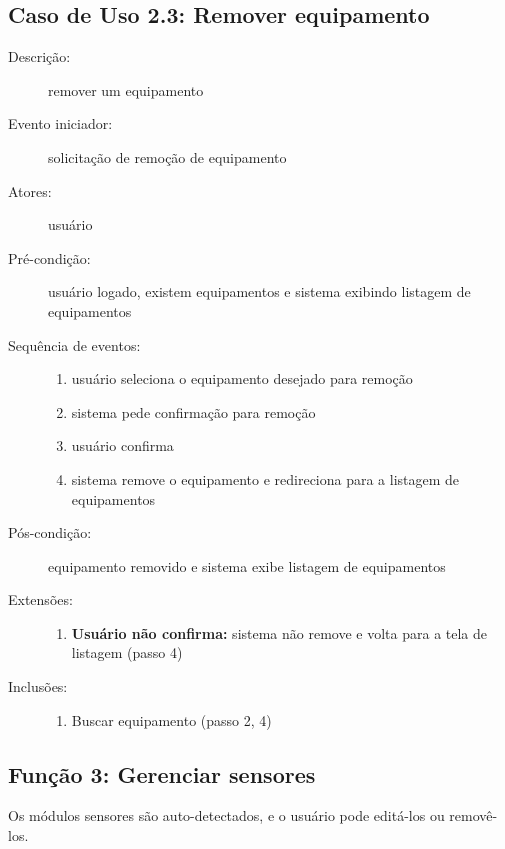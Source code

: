 \subsection{Caso de Uso 2.3: Remover equipamento}
\begin{description}
	\item[Descrição:] remover um equipamento
	\item[Evento iniciador:] solicitação de remoção de equipamento
	\item[Atores:] usuário
	\item[Pré-condição:] usuário logado, existem equipamentos e sistema exibindo listagem de equipamentos
	\item[Sequência de eventos:] \hfill
		\begin{enumerate}
			\item{usuário seleciona o equipamento desejado para remoção}
			\item{sistema pede confirmação para remoção}
			\item{usuário confirma}
			\item{sistema remove o equipamento e redireciona para a listagem de equipamentos}
		\end{enumerate}
	\item[Pós-condição:] equipamento removido e sistema exibe listagem de equipamentos
	\item[Extensões:] \hfill
		\begin{enumerate}
			\item{\textbf{Usuário não confirma:} sistema não remove e volta para a tela de listagem (passo 4)}
		\end{enumerate}
	\item[Inclusões:] \hfill
		\begin{enumerate}
			\item{Buscar equipamento (passo 2, 4)}
		\end{enumerate}
\end{description}
\subsection{Função 3: Gerenciar sensores}
Os módulos sensores são auto-detectados, e o usuário pode editá-los ou removê-los.
%
